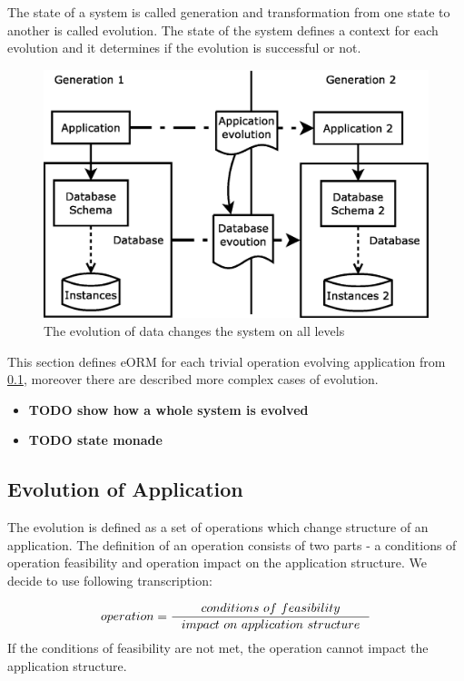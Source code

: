 \documentclass[11pt]{article}
\begin{document}
The state of a system is called generation and transformation from one state to another is called evolution. The state of the system defines a context for each evolution and it determines if the evolution is successful or not. 

\begin{figure}
\begin{center}
	\includegraphics[scale=0.4]{./images/evolution_simple}
	\caption{The evolution of data changes the system on all levels}
\end{center}
	\label{fig:evolution}
\end{figure}

This section defines eORM for each trivial operation evolving application from \ref{sec:appEvolution}, moreover there are described more complex cases of evolution. 

\begin{itemize}
	\item \textbf{TODO show how a whole system is evolved}
	\item \textbf{TODO state monade}
\end{itemize}


\subsection{Evolution of Application}
\label{sec:appEvolution}

The evolution is defined as a set of operations which change structure of an application. The definition of an operation consists of two parts - a conditions of operation feasibility and operation impact on the application structure. We decide to use following transcription:

$$
operation = \inference{conditions$ $of$ $feasibility}{impact$ $on$ $application$ $structure}
$$
If the conditions of feasibility are not met, the operation cannot impact the application structure.
\end{document}
